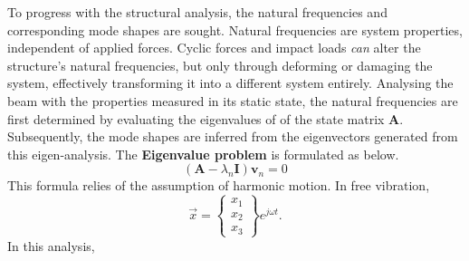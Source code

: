 \documentclass{article}
\begin{document}
To progress with the structural analysis, the natural frequencies and corresponding mode shapes are sought. Natural frequencies are system properties, independent of applied forces. Cyclic forces and impact loads \textit{can} alter the structure's natural frequencies, but only through deforming or damaging the system, effectively transforming it into a different system entirely. Analysing the beam with the properties measured in its static state, the natural frequencies are first determined by evaluating the eigenvalues of of the state matrix $\mathbf{A}$. Subsequently, the mode shapes are inferred from the eigenvectors generated from this eigen-analysis. The \textbf{Eigenvalue problem} is formulated as below.
\begin{equation}
    ({\mathbf{A}} - \lambda_n\mathbf{I})\mathbf{v}_n = 0
\end{equation}
This formula relies of the assumption of harmonic motion. In free vibration,
\begin{equation}
    \Vec{x} = \left\{ \begin{array}{c}
         x_1 \\
         x_2 \\
         x_3
    \end{array} \right\} e^{j\omega t}.
\end{equation}
In this analysis, 

\pagebreak





\end{document}
